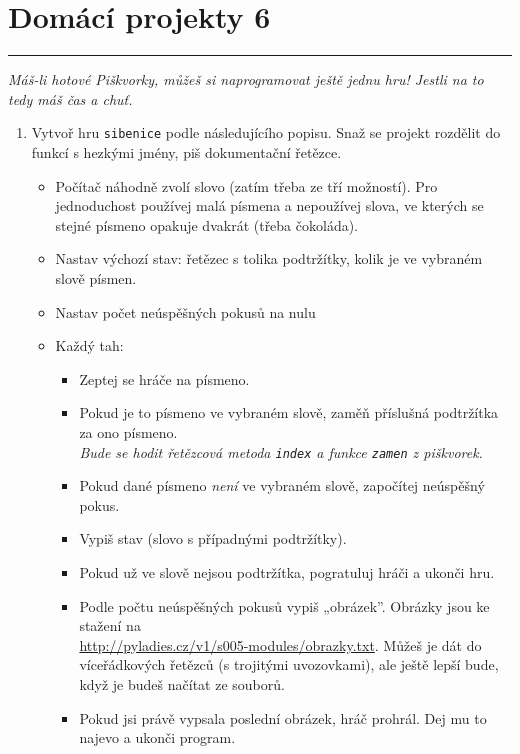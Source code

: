 \documentclass[a4paper,10pt]{article}
\newcommand\plsetno{6}
\newcommand\startsection[1]{
     \vspace{0.2ex}
    \hrule
    {\fontspec{Oxygen} \tiny
     \vspace{-1ex}
     \emph{#1}
     \vspace{-1.5em}
    }
}
\begin{document}
\section*{Domácí projekty \plsetno}

\startsection{Máš-li hotové Piškvorky, můžeš si naprogramovat ještě jednu hru! Jestli na to tedy máš čas a chuť.}

\begin{enumerate}[resume]

\item Vytvoř hru \texttt{sibenice} podle následujícího popisu.
    Snaž se projekt rozdělit do funkcí s hezkými jmény, piš dokumentační řetězce.

    \begin{itemize}
        \item Počítač náhodně zvolí slovo (zatím třeba ze tří možností).
            Pro jednoduchost používej malá písmena a nepoužívej slova,
            ve kterých se stejné písmeno opakuje dvakrát
            (třeba č\textcolor{plpink}{o}k\textcolor{plpink}{o}láda).
        \item Nastav výchozí stav: řetězec s tolika podtržítky, kolik je
             ve vybraném slově písmen.
        \item Nastav počet neúspěšných pokusů na nulu
        \item Každý tah:
            \begin{itemize}
                \item Zeptej se hráče na písmeno.
                \item Pokud je to písmeno ve vybraném slově, zaměň příslušná
                    podtržítka za ono písmeno.
                    \\\emph{\small Bude se hodit řetězcová metoda \texttt{index}
                    a funkce \texttt{zamen} z piškvorek.}
                \item Pokud dané písmeno \emph{není} ve vybraném slově,
                    započítej neúspěšný pokus.
                \item Vypiš stav (slovo s případnými podtržítky).
                \item Pokud už ve slově nejsou podtržítka, pogratuluj hráči
                    a ukonči hru.
                \item Podle počtu neúspěšných pokusů vypiš „obrázek”.
                    Obrázky jsou ke stažení na \\\url{http://pyladies.cz/v1/s005-modules/obrazky.txt}.
                    Můžeš je dát do víceřádkových řetězců (s trojitými uvozovkami),
                    ale ještě lepší bude, když je budeš načítat ze souborů.
                \item Pokud jsi právě vypsala poslední obrázek, hráč prohrál.
                    Dej mu to najevo a ukonči program.
            \end{itemize}
    \end{itemize}


\end{enumerate}
\end{document}
